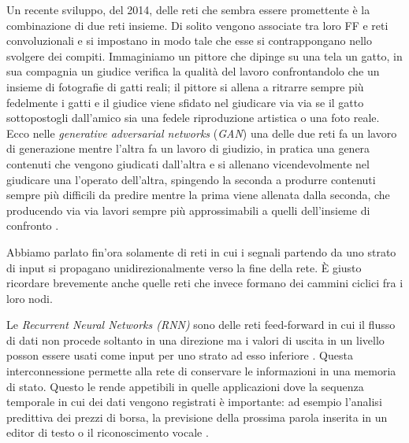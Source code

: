 Un recente sviluppo, del 2014, delle reti che sembra essere promettente è la combinazione di due reti insieme. Di solito vengono associate tra loro FF e reti convoluzionali e si impostano in modo tale che esse si contrappongano nello svolgere dei compiti. Immaginiamo un pittore che dipinge su una tela un gatto, in sua compagnia un giudice verifica la qualità del lavoro confrontandolo che un insieme di fotografie di gatti reali; il pittore si allena a ritrarre sempre più fedelmente i gatti e il giudice viene sfidato nel giudicare via via se il gatto sottopostogli dall'amico sia una fedele riproduzione artistica o una foto reale. Ecco nelle \emph{generative adversarial networks} (\textit{GAN}) una delle due reti fa un lavoro di generazione mentre l'altra fa un lavoro di giudizio, in pratica una genera contenuti che vengono giudicati dall'altra e si allenano vicendevolmente nel giudicare una l'operato dell'altra, spingendo la seconda a produrre contenuti sempre più difficili da predire mentre la prima viene allenata dalla seconda, che producendo via via lavori sempre più approssimabili a quelli dell'insieme di confronto \cite{goodfellow2014generative}.

Abbiamo parlato fin'ora solamente di reti in cui i segnali partendo da uno strato di input si propagano unidirezionalmente verso la fine della rete. \`E giusto ricordare brevemente anche quelle reti che invece formano dei cammini ciclici fra i loro nodi.

Le \emph{Recurrent Neural Networks (RNN)} sono delle reti feed-forward in cui il flusso di dati non procede soltanto in una direzione ma i valori di uscita in un livello posson essere usati come input per uno strato ad esso inferiore \cite{elman1990finding}. Questa interconnessione permette alla rete di conservare le informazioni in una memoria di stato. Questo le rende appetibili in quelle applicazioni dove la sequenza temporale in cui dei dati vengono registrati è importante: ad esempio l'analisi predittiva dei prezzi di borsa, la previsione della prossima parola inserita in un editor di testo o il riconoscimento vocale \cite{rrn-medium}.

